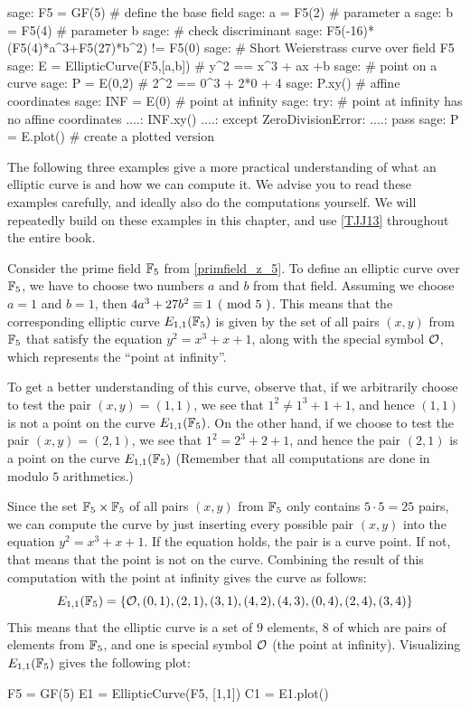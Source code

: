 \begin{sagecommandline}
sage: F5 = GF(5) # define the base field
sage: a = F5(2) # parameter a
sage: b = F5(4) # parameter b
sage: # check discriminant
sage: F5(-16)*(F5(4)*a^3+F5(27)*b^2) != F5(0)
sage: # Short Weierstrass curve over field F5
sage: E = EllipticCurve(F5,[a,b]) # y^2 == x^3 + ax +b 
sage: # point on a curve
sage: P = E(0,2) # 2^2 == 0^3 + 2*0 + 4
sage: P.xy() # affine coordinates
sage: INF = E(0) # point at infinity
sage: try: 	# point at infinity has no affine coordinates
....:     INF.xy()
....: except ZeroDivisionError:
....:     pass
sage: P = E.plot() # create a plotted version 
\end{sagecommandline}
The following three examples give a more practical understanding of what an elliptic curve is and how we can compute it. We advise you to read these examples carefully, and ideally also do the computations yourself. We will repeatedly build on these examples in this chapter, and use \examplename{} \ref{TJJ13}  throughout the entire book.
\begin{example}\label{E1F5} Consider the prime field $\mathbb{F}_5$ from \examplename{} \ref{primfield_z_5}. To define an elliptic curve over $\mathbb{F}_5$, we have to choose two numbers $a$ and $b$ from that field. Assuming we choose $a=1$ and $b=1$, then $\kongru{4a^3+ 27b^2}{1}{5}$. This means that the corresponding elliptic curve $E_{1,1}(\mathbb{F}_5)$ is given by the set of all pairs $(x,y)$ from $\mathbb{F}_5$ that satisfy the equation $y^2=x^3+x+1$, along with the special symbol $\mathcal{O}$, which represents the ``point at infinity''. 

To get a better understanding of this curve, observe that, if we arbitrarily choose to test the pair $(x,y)=(1,1)$, we see that $1^2 \neq 1^3+1 + 1$, and hence $(1,1)$ is not a point on the curve $E_{1,1}(\mathbb{F}_5)$. On the other hand, if we choose to test the pair $(x,y)=(2,1)$, we see that $1^2 = 2^3 + 2 + 1$, and hence the pair $(2,1)$ is a point on the curve $E_{1,1}(\mathbb{F}_5)$ (Remember that all computations are done in modulo $5$ arithmetics.)

Since the set $\mathbb{F}_5\times \mathbb{F}_5$ of all pairs $(x,y)$ from $\mathbb{F}_5$ only contains  $5\cdot 5=25$ pairs, we can compute the curve by just inserting every possible pair $(x,y)$ into the  equation $y^2 = x^3 + x +1$. If the equation holds, the pair is a curve point. If not, that means that the point is not on the curve. Combining the result of this computation with the point at infinity gives the curve as follows:
$$
E_{1,1}(\mathbb{F}_5) = \{\mathcal{O}, (0,1),(2,1),(3,1),(4,2),(4,3),(0,4),(2,4),(3,4)\}
$$
This means that the elliptic curve is a set of $9$ elements, $8$ of which are pairs of elements from $\mathbb{F}_5$, and one is special symbol $\mathcal{O}$ (the point at infinity). Visualizing $E_{1,1}(\mathbb{F}_5)$ gives the following plot:
\begin{sagesilent}
F5 = GF(5)
E1 = EllipticCurve(F5, [1,1])
C1 = E1.plot()
\end{sagesilent}
\begin{center} 
\end{center}
\end{example}

